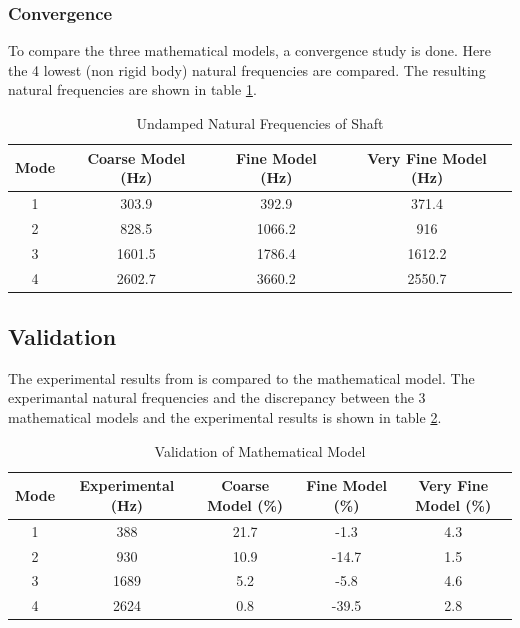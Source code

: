\subsubsection{Convergence}
To compare the three mathematical models, a convergence study is done. Here the 4 lowest (non rigid body) natural frequencies are compared.
The resulting natural frequencies are shown in table \ref{tab:natural_freq}.
\begin{table}[htbp]
    \centering
    \caption{Undamped Natural Frequencies of Shaft}
    \label{tab:natural_freq}
    \begin{tabular}{@{}cccc@{}}
        \toprule
        Mode    &   Coarse Model (\si{\hertz})    &   Fine Model (\si{\hertz})  &   Very Fine Model (\si{\hertz}) \\ \midrule
        1       &   303.9   &   392.9   &   371.4   \\
        2       &   828.5   &   1066.2  &   916     \\
        3       &   1601.5  &   1786.4  &   1612.2  \\
        4       &   2602.7  &   3660.2  &   2550.7  \\ \bottomrule
    \end{tabular}
\end{table}

\subsection{Validation}
The experimental results from \cite[6]{Problem} is compared to the mathematical model. The experimantal natural frequencies and the discrepancy between the 3 mathematical models and the experimental results is shown in table \ref{tab:validation}.

\begin{table}[htbp]
    \begin{adjustwidth}{-1cm}{-1cm}
    \centering
    \caption{Validation of Mathematical Model}
    \label{tab:validation}
    \begin{tabular}{@{}ccccc@{}}
        \toprule
        Mode    &   Experimental (\si{\hertz})    &   Coarse Model (\si{\percent})    &   Fine Model (\si{\percent})  &   Very Fine Model (\si{\percent}) \\ \midrule
        1       &   388     &   21.7   &   -1.3   &   4.3   \\
        2       &   930     &   10.9   &   -14.7  &   1.5     \\
        3       &   1689    &   5.2  &   -5.8  &   4.6  \\
        4       &   2624    &   0.8  &   -39.5  &   2.8  \\ \bottomrule
    \end{tabular}
    \end{adjustwidth}
\end{table}


